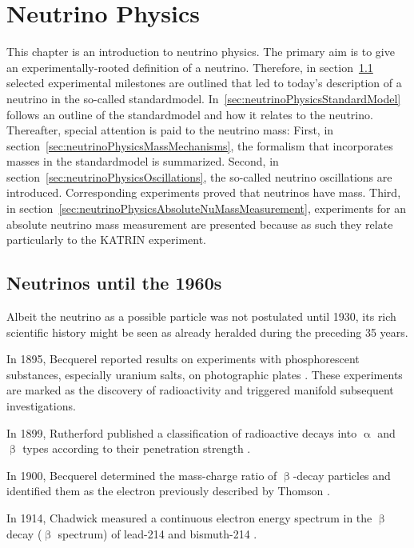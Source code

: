 \def\currentRootFolder{chapter/neutrinoPhysics}
\def\currentFigureFolder{\currentRootFolder/fig}

\chapter{Neutrino Physics}
\label{sec:neutrinoPhysics}
This chapter is an introduction to neutrino physics. The primary aim is to give an experimentally-rooted definition of a neutrino. Therefore, in section~\ref{sec:neutrinoPhysicsHistory} selected experimental milestones are outlined that led to today's description of a neutrino in the so-called \gls{standardmodel}. In~\ref{sec:neutrinoPhysicsStandardModel} follows an outline of the \gls{standardmodel} and how it relates to the neutrino. Thereafter, special attention is paid to the neutrino mass: First, in section~\ref{sec:neutrinoPhysicsMassMechanisms}, the formalism that incorporates masses in the \gls{standardmodel} is summarized. Second, in section~\ref{sec:neutrinoPhysicsOscillations}, the so-called neutrino oscillations are introduced. Corresponding experiments proved that neutrinos have mass. Third, in section~\ref{sec:neutrinoPhysicsAbsoluteNuMassMeasurement}, experiments for an absolute neutrino mass measurement are presented because as such they relate particularly to the KATRIN experiment.

\section{Neutrinos until the 1960s}
\label{sec:neutrinoPhysicsHistory}
Albeit the neutrino as a possible particle was not postulated until 1930, its rich scientific history might be seen as already heralded during the preceding 35 years. 

In 1895, Becquerel reported results on experiments with phosphorescent substances, especially uranium salts, on photographic plates \cite{Becquerel:1}. These experiments are marked as the discovery of radioactivity and triggered manifold subsequent investigations. 

In 1899, Rutherford published a classification of radioactive decays into $\upalpha$ and $\upbeta$ types according to their penetration strength \cite{Rutherford:1}. 

In 1900, Becquerel determined the mass-charge ratio of $\upbeta$-decay particles and identified them as the electron previously described by Thomson \cite{Becquerel:2} \cite{Thomson:1}. 

In 1914, Chadwick measured a continuous electron energy spectrum in the $\upbeta$ decay ($\upbeta$ spectrum) of lead-214 and bismuth-214 \cite{Chadwick:1}. 

